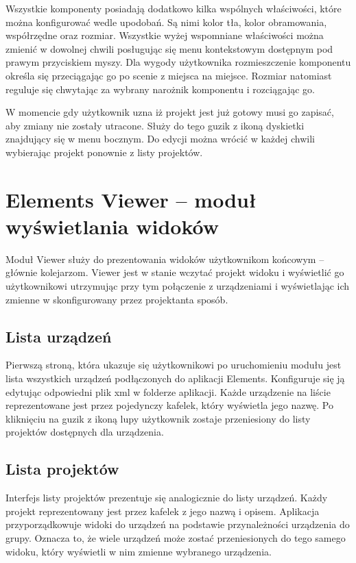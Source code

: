 Wszystkie komponenty posiadają dodatkowo kilka wspólnych właściwości, które można konfigurować wedle upodobań. Są nimi kolor tła, kolor obramowania, współrzędne oraz rozmiar. Wszystkie wyżej wspomniane właściwości można zmienić w dowolnej chwili posługując się menu kontekstowym dostępnym pod prawym przyciskiem myszy.  Dla wygody użytkownika rozmieszczenie komponentu określa się przeciągając go po scenie z miejsca na miejsce. Rozmiar natomiast reguluje się chwytając za wybrany narożnik komponentu i rozciągając go.

W momencie gdy użytkownik uzna iż projekt jest już gotowy musi go zapisać, aby zmiany nie zostały utracone. Służy do tego guzik z ikoną dyskietki znajdujący się w menu bocznym. Do edycji można wrócić w każdej chwili wybierając projekt ponownie z listy projektów.


\section{Elements Viewer – moduł wyświetlania widoków}
Moduł Viewer służy do prezentowania widoków użytkownikom końcowym – głównie kolejarzom. Viewer jest w stanie wczytać projekt widoku i wyświetlić go użytkownikowi utrzymując przy tym połączenie z urządzeniami i wyświetlając ich zmienne w skonfigurowany przez projektanta sposób.

\subsection{Lista urządzeń}
Pierwszą stroną, która ukazuje się użytkownikowi po uruchomieniu modułu jest lista wszystkich urządzeń podłączonych do aplikacji Elements. Konfiguruje się ją edytując odpowiedni plik xml w folderze aplikacji. Każde urządzenie na liście reprezentowane jest przez pojedynczy kafelek, który wyświetla jego nazwę. Po kliknięciu na guzik z ikoną lupy użytkownik zostaje przeniesiony do listy projektów dostępnych dla urządzenia.

\subsection{Lista projektów}
Interfejs listy projektów prezentuje się analogicznie do listy urządzeń. Każdy projekt reprezentowany jest przez kafelek z jego nazwą i opisem. Aplikacja przyporządkowuje widoki do urządzeń na podstawie przynależności urządzenia do grupy. Oznacza to, że wiele urządzeń może zostać przeniesionych do tego samego widoku, który wyświetli w nim zmienne wybranego urządzenia.

